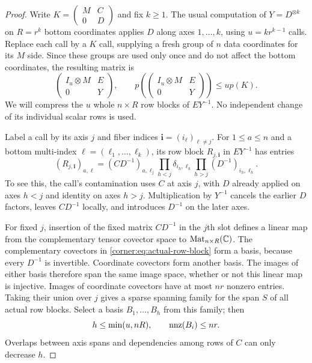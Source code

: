 \begin{proof}
Write $K=\begin{pmatrix}M&C\\0&D\end{pmatrix}$ and fix $k\ge1$.
The usual computation of $Y=D^{\otimes k}$ on $R=r^k$ bottom
coordinates applies $D$ along axes $1,\ldots,k$, using
$u=kr^{k-1}$ calls.  Replace each call by a $K$ call, supplying a
fresh group of $n$ data coordinates for its $M$ side.  Since these
groups are used only once and do not affect the bottom coordinates,
the resulting matrix is
\[
 \begin{pmatrix}I_u\otimes M&E\\0&Y\end{pmatrix},
 \qquad p\left(\begin{pmatrix}I_u\otimes M&E\\0&Y\end{pmatrix}\right)
 \le u p(K).
\]
We will compress the $u$ whole $n\times R$ row blocks of $EY^{-1}$.
No independent change of its individual scalar rows is used.

Label a call by its axis $j$ and fiber indices
$\mathbf i=(i_\ell)_{\ell\ne j}$.  For $1\le a\le n$ and a bottom
multi-index $\boldsymbol\ell=(\ell_1,\ldots,\ell_k)$, its row block
$R_{j,\mathbf i}$ in $EY^{-1}$ has entries
\begin{equation}
 (R_{j,\mathbf i})_{a,\boldsymbol\ell}
 =(CD^{-1})_{a,\ell_j}
   \prod_{h<j}\delta_{i_h,\ell_h}
   \prod_{h>j}(D^{-1})_{i_h,\ell_h}.
 \label{corner:eq:actual-row-block}
\end{equation}
To see this, the call's contamination uses $C$ at axis $j$, with
$D$ already applied on axes $h<j$ and identity on axes $h>j$.
Multiplication by $Y^{-1}$ cancels the earlier $D$ factors, leaves
$CD^{-1}$ locally, and introduces $D^{-1}$ on the later axes.

For fixed $j$, insertion of the fixed matrix $CD^{-1}$ in the $j$th
slot defines a linear map from the complementary tensor covector
space to $\operatorname{Mat}_{n\times R}(\mathbb C)$.  The complementary covectors in
\cref{corner:eq:actual-row-block} form a basis, because every
$D^{-1}$ is invertible.  Coordinate covectors form another basis.
The images of either basis therefore span the same image space,
whether or not this linear map is injective.  Images of coordinate
covectors have at most $nr$ nonzero entries.  Taking their union over
$j$ gives a sparse spanning family for the span $S$ of all actual
row blocks.  Select a basis $B_1,\ldots,B_h$ from this family; then
\[
 h\le\min(u,nR),\qquad \operatorname{nnz}(B_i)\le nr.
\]
Overlaps between axis spans and dependencies among rows of $C$ can
only decrease $h$.


\end{proof}
